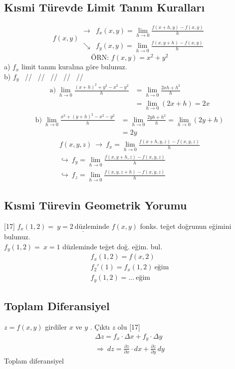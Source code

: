 \documentclass[11pt,a4paper]{article}
\begin{document}
\subsection{Kısmi Türevde Limit Tanım Kuralları}
\[ f(x,y)\ \begin{array}{ll}\to&f_x(x,y)=\displaystyle\lim_{h\to0}\frac{f(x+h,y)-f(x,y)}{h}\\[4mm] \searrow&f_y(x,y)=\displaystyle\lim_{h\to0}\frac{f(x,y+h)-f(x,y)}{h}\end{array} \]
\[ \text{ÖRN: }f(x,y)=x^2+y^2 \]
a) $f_x$ limit tanım kuralına göre bulunuz.\\
b) $f_y$ \ // \ // \ // \ // \ //
\begin{align*}
\text{a)}\ \lim_{h\to0}\frac{(x+h)^2+y^2-x^2-y^2}{h}&=\lim_{h\to0}\frac{2xh+h^2}{h}\\
&=\lim_{h\to0}(2x+h)=2x
\end{align*}
\begin{align*}
\text{b)}\ \lim_{h\to0}\frac{x^2+(y+h)^2-x^2-y^2}{h}&=\lim_{h\to0}\frac{2yh+h^2}{h}=\lim_{h\to0}(2y+h)\\
&=2y
\end{align*}
\begin{gather*}
f(x,y,z)\ \to\ f_x=\lim_{h\to0}\frac{f(x+h,y,z)-f(x,y,z)}{h}\\
\hookrightarrow\ f_y=\lim_{h\to0}\frac{f(x,y+h,z)-f(x,y,z)}{h}\\
\hookrightarrow\ f_z=\lim_{h\to0}\frac{f(x,y,z+h)-f(x,y,z)}{h}
\end{gather*}

\subsection{Kısmi Türevin Geometrik Yorumu}
[17]
$f_x(1,2)=\ \underline{y=2\ \text{düzleminde}}$ $f(x,y)$ fonks. teğet doğrunun eğimini bulunuz.\\
$f_y(1,2)=\ x=1$ düzleminde teğet doğ. eğim. bul.
\begin{gather*}
f_x(1,2)=f(x,2)\\
f_2'(1)=f_x(1,2)\ \text{eğim}\\
f_y(1,2)=\ldots\ \text{eğim}
\end{gather*}

\subsection{Toplam Diferansiyel}
$z=f(x,y)$ girdiler $x$ ve $y$ . Çıktı $z$ olu
[17]
\begin{gather*}
\Delta z=f_x\cdot\Delta x+f_y\cdot\Delta y\\
\Rightarrow\ dz=\frac{\partial z}{\partial x}\cdot dx+\frac{\partial z}{\partial y}\,dy
\end{gather*}
Toplam diferansiyel
\end{document}
